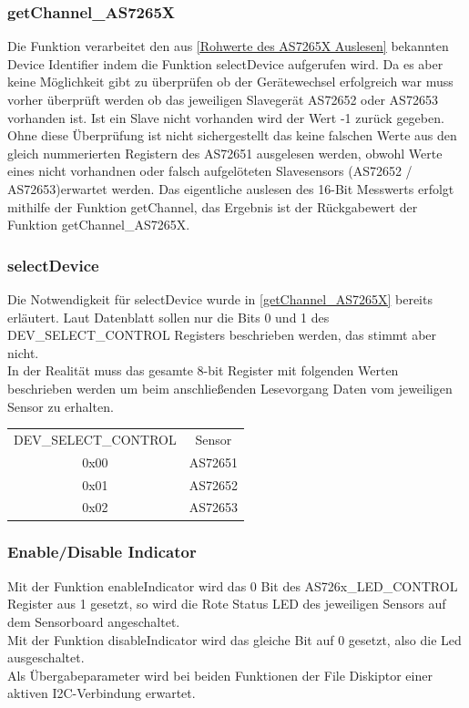 \subsubsection{getChannel\_AS7265X}
Die Funktion verarbeitet den aus \ref{Rohwerte des AS7265X Auslesen} bekannten Device Identifier indem die Funktion selectDevice aufgerufen wird.
	Da es aber keine Möglichkeit gibt zu überprüfen ob der Gerätewechsel erfolgreich war muss vorher überprüft werden ob das jeweiligen Slavegerät AS72652 oder AS72653 vorhanden ist.
	Ist ein Slave nicht vorhanden wird der Wert -1 zurück gegeben.
	Ohne diese Überprüfung ist nicht sichergestellt das keine falschen Werte aus den gleich nummerierten Registern des AS72651 ausgelesen werden, obwohl Werte eines nicht vorhandnen oder falsch aufgelöteten Slavesensors (AS72652 / AS72653)erwartet werden.
	Das eigentliche auslesen des 16-Bit Messwerts erfolgt mithilfe der Funktion getChannel, das Ergebnis ist der Rückgabewert der Funktion getChannel\_AS7265X.\\



\subsubsection{selectDevice}
Die Notwendigkeit für selectDevice wurde in \ref{getChannel_AS7265X} bereits erläutert.
Laut Datenblatt sollen nur die Bits 0 und 1 des DEV\_SELECT\_CONTROL Registers beschrieben werden, das stimmt aber nicht.\\
In der Realität muss das gesamte 8-bit Register mit folgenden Werten beschrieben werden um beim anschließenden Lesevorgang Daten vom jeweiligen Sensor zu erhalten.
\begin{center}
\begin{tabular}{ c c }
 	DEV\_SELECT\_CONTROL & Sensor \\ 
 	0x00 & AS72651 \\  
 	0x01 & AS72652 \\
 	0x02 & AS72653 \\  
\end{tabular}
\end{center}



\subsubsection{Enable/Disable Indicator}
Mit der Funktion enableIndicator wird das 0 Bit des AS726x\_LED\_CONTROL Register aus 1 gesetzt, so wird die Rote Status LED des jeweiligen Sensors auf dem Sensorboard angeschaltet.\\
Mit der Funktion disableIndicator wird das gleiche Bit auf 0 gesetzt, also die Led ausgeschaltet.\\
Als Übergabeparameter wird bei beiden Funktionen der File Diskiptor einer aktiven I2C-Verbindung erwartet.\\

